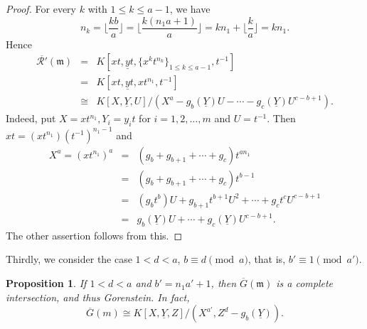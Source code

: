 \documentclass[12pt]{amsart}
\newtheorem{prop}[thm]{Proposition}
\theoremstyle{definition}
\theoremstyle{remark}
\numberwithin{equation}{section}
\newcommand{\m}{{\mathfrak m}}
\begin{document}
\begin{proof}
For every $k$ with $1 \le k \le a-1$, we have 
\[
n_k
=\lfloor \frac{kb}{a} \rfloor 
= \lfloor \frac{k(n_1a+1)}{a} \rfloor
=kn_1+ \lfloor \dfrac{k}{a} \rfloor = kn_1. 
\]
Hence 
\begin{eqnarray*}
\overline{\mathcal{R}'}(\m) &=& 
 K[xt, \underline{y}t,\{x^kt^{n_k}\}_{1 \le k \le a-1}, t^{-1}] \\
&=&  K[xt, \underline{y}t, xt^{n_1},t^{-1}] \\
&\cong & K[X,\underline{Y},U]/(X^a-g_b(\underline{Y})U-
\cdots -g_c(\underline{Y})U^{c-b+1}). 
\end{eqnarray*}
Indeed, put  $X = xt^{n_1}, Y_i = y_it$ for $i = 1, 2, \ldots, m$  and $U = t^{-1}$. Then $xt=(xt^{n_1})(t^{-1})^{n_1-1}$ and 
\begin{eqnarray*}
X^a=(xt^{n_1})^a &=& (g_b+g_{b+1}+\cdots+g_c)t^{an_1} \\
&=& (g_b+g_{b+1}+\cdots+g_c)t^{b-1} \\
&=& (g_bt^b)U+g_{b+1}t^{b+1}U^2+\cdots+g_ct^cU^{c-b+1} \\
&=& g_b(\underline{Y})U+\cdots +g_c(\underline{Y})U^{c-b+1}. 
\end{eqnarray*}
The other assertion follows from this. 
\end{proof}

\par \vspace{2mm}
Thirdly, we consider the case $1 <  d < a$, $b \equiv d \pmod{a}$, that is, $b' \equiv 1 \pmod{a'}$. 
\begin{prop} 
If $1<d<a$ and $b'=n_1a'+1$, then  
$\overline{G}(\m)$ is a complete intersection, and thus Gorenstein. 
In fact, 
\[
\overline{G}(m) \cong K[X,\underline{Y},Z]/(X^{a'}, Z^d-g_b(\underline{Y})).
\] 
\end{prop}
\end{document}
